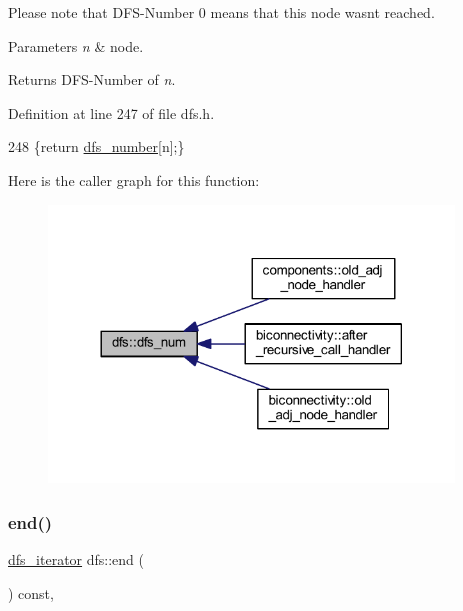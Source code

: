 Please note that D\+F\+S-\/\+Number 0 means that this node wasn\textquotesingle{}t reached.


\begin{DoxyParams}{Parameters}
{\em n} & node. \\
\hline
\end{DoxyParams}
\begin{DoxyReturn}{Returns}
D\+F\+S-\/\+Number of {\itshape n}. 
\end{DoxyReturn}


Definition at line 247 of file dfs.\+h.


\begin{DoxyCode}
248     \{\textcolor{keywordflow}{return} \mbox{\hyperlink{classdfs_a99727f2274d6af63daae4f0518f3adbe}{dfs\_number}}[n];\}
\end{DoxyCode}
Here is the caller graph for this function\+:
\nopagebreak
\begin{figure}[H]
\begin{center}
\leavevmode
\includegraphics[width=305pt]{classdfs_a315f16831a0bd333960e87e045cb37c8_icgraph}
\end{center}
\end{figure}
\mbox{\label{classdfs_af847633fa642258d3522e8deb26aef37}} 
\subsubsection{\texorpdfstring{end()}{end()}}
{\footnotesize\ttfamily \mbox{\hyperlink{classdfs_a15fe023a5a1f7ddda00f3d87110d9a32}{dfs\+\_\+iterator}} dfs\+::end (\begin{DoxyParamCaption}{ }\end{DoxyParamCaption}) const\hspace{0.3cm}{\ttfamily [inline]}, {\ttfamily [inherited]}}



